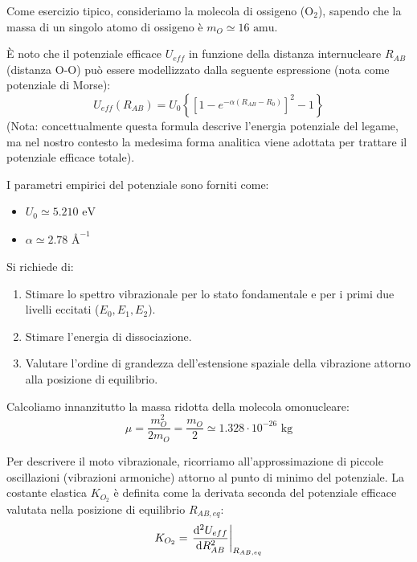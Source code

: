 \begin{exercise}
    Come esercizio tipico, consideriamo la molecola di ossigeno (\( \text{O}_2 \)), sapendo che la massa di un singolo atomo di ossigeno è \( m_O \simeq 16 \text{ amu} \).

    È noto che il potenziale efficace \( U_{eff} \) in funzione della distanza internucleare \( R_{AB} \) (distanza O-O) può essere modellizzato dalla seguente espressione (nota come potenziale di Morse):
    \begin{equation}
        U_{eff}(R_{AB}) = U_0 \left\{ \left[ 1 - e^{-\alpha(R_{AB} - R_0)} \right]^2 - 1 \right\}
    \end{equation}
    (Nota: concettualmente questa formula descrive l'energia potenziale del legame, ma nel nostro contesto la medesima forma analitica viene adottata per trattare il potenziale efficace totale).

    I parametri empirici del potenziale sono forniti come:
    \begin{itemize}
        \item \( U_0 \simeq 5.210 \text{ eV} \)
        \item \( \alpha \simeq 2.78 \text{ \AA}^{-1} \)
    \end{itemize}

    Si richiede di:
    \begin{enumerate}
        \item Stimare lo spettro vibrazionale per lo stato fondamentale e per i primi due livelli eccitati (\( E_0, E_1, E_2 \)).
        \item Stimare l'energia di dissociazione.
        \item Valutare l'ordine di grandezza dell'estensione spaziale della vibrazione attorno alla posizione di equilibrio.
    \end{enumerate}

\begin{solution}
    Calcoliamo innanzitutto la massa ridotta della molecola omonucleare:
    \begin{equation}
        \mu = \frac{m_O^2}{2m_O} = \frac{m_O}{2} \simeq 1.328 \cdot 10^{-26} \text{ kg}
    \end{equation}

    Per descrivere il moto vibrazionale, ricorriamo all'approssimazione di piccole oscillazioni (vibrazioni armoniche) attorno al punto di minimo del potenziale. La costante elastica \( K_{O_2} \) è definita come la derivata seconda del potenziale efficace valutata nella posizione di equilibrio \( R_{AB,eq} \):
    \begin{equation}
        K_{O_2} = \left. \dv[2]{U_{eff}}{R_{AB}} \right|_{R_{AB,eq}}
    \end{equation}


\end{solution}
\end{exercise}

